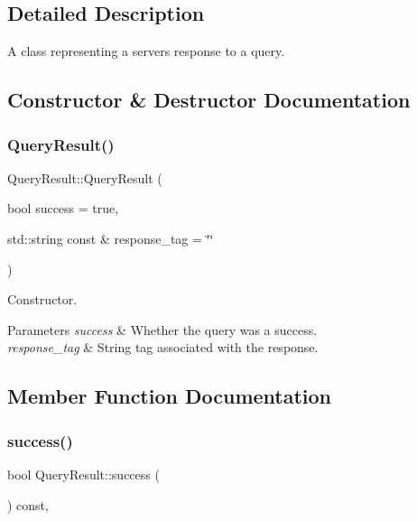 \subsection{Detailed Description}
A class representing a server\textquotesingle{}s response to a query. 

\subsection{Constructor \& Destructor Documentation}
\mbox{\label{class_query_result_ae7376f37c36d6df11cb0a6d809f54ac3}} 
\subsubsection{\texorpdfstring{Query\+Result()}{QueryResult()}}
{\footnotesize\ttfamily Query\+Result\+::\+Query\+Result (\begin{DoxyParamCaption}\item[{bool}]{success = {\ttfamily true},  }\item[{std\+::string const \&}]{response\+\_\+tag = {\ttfamily \char`\"{}\char`\"{}} }\end{DoxyParamCaption})\hspace{0.3cm}{\ttfamily [inline]}}



Constructor. 


\begin{DoxyParams}{Parameters}
{\em success} & Whether the query was a success. \\
\hline
{\em response\+\_\+tag} & String tag associated with the response. \\
\hline
\end{DoxyParams}


\subsection{Member Function Documentation}
\mbox{\label{class_query_result_ae1b66d19c66ed5c97dd3322c3c721c82}} 
\subsubsection{\texorpdfstring{success()}{success()}}
{\footnotesize\ttfamily bool Query\+Result\+::success (\begin{DoxyParamCaption}{ }\end{DoxyParamCaption}) const\hspace{0.3cm}{\ttfamily [inline]}, {\ttfamily [noexcept]}}



